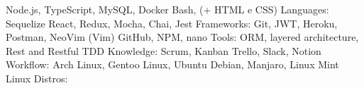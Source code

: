 \begin{cvhonors}
  \cvhonor
    {Node.js, TypeScript, MySQL, Docker}
    {Bash, (+ HTML e CSS)}
    {}
    {Languages:}
  \cvhonor
    {Sequelize}
    {React, Redux, Mocha, Chai, Jest}
    {}
    {Frameworks:}
  \cvhonor
    {Git, JWT, Heroku, Postman, NeoVim (Vim)}
    {GitHub, NPM, nano}
    {}
    {Tools:}
 \cvhonor
    {ORM, layered architecture, Rest and Restful}
    {TDD}
    {}
    {Knowledge:}
  \cvhonor
    {Scrum, Kanban}
    {Trello, Slack, Notion}
    {}
    {Workflow:}
  \cvhonor
    {Arch Linux, Gentoo Linux, Ubuntu}
    {Debian, Manjaro, Linux Mint}
    {}
    {Linux Distros:}
\end{cvhonors}

\vspace{.5cm}

